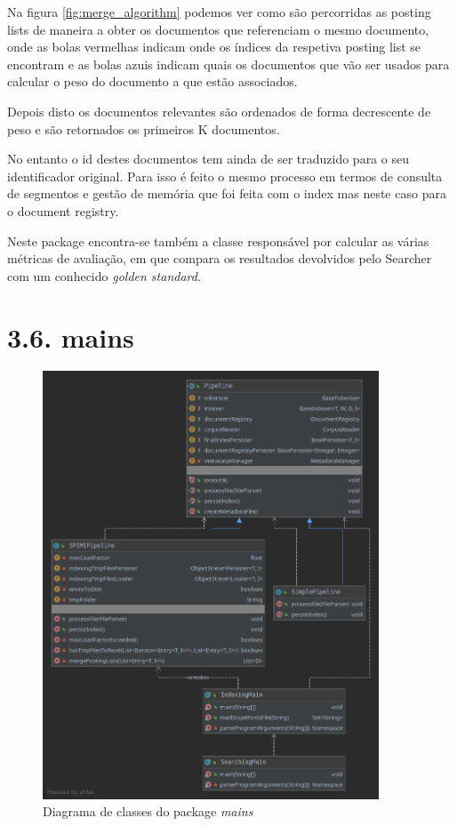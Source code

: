 \documentclass[12pt]{article}
\begin{document}
Na figura \ref{fig:merge_algorithm} podemos ver como são percorridas
as posting lists de maneira a obter os documentos que referenciam o
mesmo documento, onde as bolas vermelhas indicam onde os índices da
respetiva posting list se encontram e as bolas azuis indicam quais os
documentos que vão ser usados para calcular o peso do documento a
que estão associados.

Depois disto os documentos relevantes são ordenados de forma
decrescente de peso e são retornados os primeiros K documentos.

No entanto o id destes documentos tem ainda de ser traduzido para o
seu identificador original.
Para isso é feito o mesmo processo em termos de consulta de segmentos
e gestão de memória que foi feita com o index mas neste caso para o
document registry.

Neste package encontra-se também a classe responsável por calcular as
várias métricas de avaliação, em que compara os resultados devolvidos
pelo Searcher com um conhecido {\it golden standard}.

\section*{3.6. mains}
\begin{figure}[H]
  \center
   \includegraphics[width=10cm]{packages_mains.png}
  \caption{Diagrama de classes do package \it mains}
\end{figure}
\end{document}
